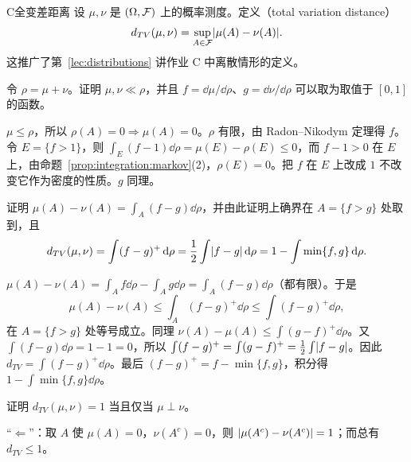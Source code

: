 \begin{probleme}{C}{全变差距离}
设 $\mu,\nu$ 是 $(\Omega,\mathcal{F})$ 上的概率测度。定义（total variation distance）
\[
d_{TV}(\mu,\nu)=\sup_{A\in\mathcal{F}}\lvert \mu(A)-\nu(A)\rvert.
\]
这推广了第~\ref{lec:distributions} 讲作业 C 中离散情形的定义。
\begin{questions}
\item 令 $\rho=\mu+\nu$。证明 $\mu,\nu\ll\rho$，并且 $f=\dd\mu/\dd\rho$、$g=\dd\nu/\dd\rho$ 可以取为取值于 $[0,1]$ 的函数。
\begin{solution}
$\mu\leqslant\rho$，所以 $\rho(A)=0\Rightarrow\mu(A)=0$。$\rho$ 有限，由 Radon--Nikodym 定理得 $f$。令 $E=\{f>1\}$，则 $\int_E(f-1)\dd\rho=\mu(E)-\rho(E)\leqslant0$，而 $f-1>0$ 在 $E$ 上，由命题~\ref{prop:integration:markov}(2)，$\rho(E)=0$。把 $f$ 在 $E$ 上改成 $1$ 不改变它作为密度的性质。$g$ 同理。
\end{solution}
\item 证明 $\mu(A)-\nu(A)=\int_A(f-g)\dd\rho$，并由此证明上确界在 $A=\{f>g\}$ 处取到，且
\[
d_{TV}(\mu,\nu)=\int(f-g)^+\,\mathrm{d}\rho=\frac12\int\lvert f-g\rvert\,\mathrm{d}\rho=1-\int\min\{f,g\}\,\mathrm{d}\rho .
\]
\begin{solution}
$\mu(A)-\nu(A)=\int_Af\dd\rho-\int_Ag\dd\rho=\int_A(f-g)\dd\rho$（都有限）。于是
\[
\mu(A)-\nu(A)\leqslant\int_A(f-g)^+\dd\rho\leqslant\int(f-g)^+\dd\rho,
\]
在 $A=\{f>g\}$ 处等号成立。同理 $\nu(A)-\mu(A)\leqslant\int(g-f)^+\dd\rho$。又 $\int(f-g)\dd\rho=1-1=0$，所以 $\int(f-g)^+=\int(g-f)^+=\frac12\int\lvert f-g\rvert$。因此 $d_{TV}=\int(f-g)^+\dd\rho$。最后 $(f-g)^+=f-\min\{f,g\}$，积分得 $1-\int\min\{f,g\}\dd\rho$。
\end{solution}
\item 证明 $d_{TV}(\mu,\nu)=1$ 当且仅当 $\mu\perp\nu$。
\begin{solution}
“$\Leftarrow$”：取 $A$ 使 $\mu(A)=0$，$\nu(A^c)=0$，则 $\lvert \mu(A^c)-\nu(A^c)\rvert=1$；而总有 $d_{TV}\leqslant1$。


\end{solution}
\end{questions}
\end{probleme}
